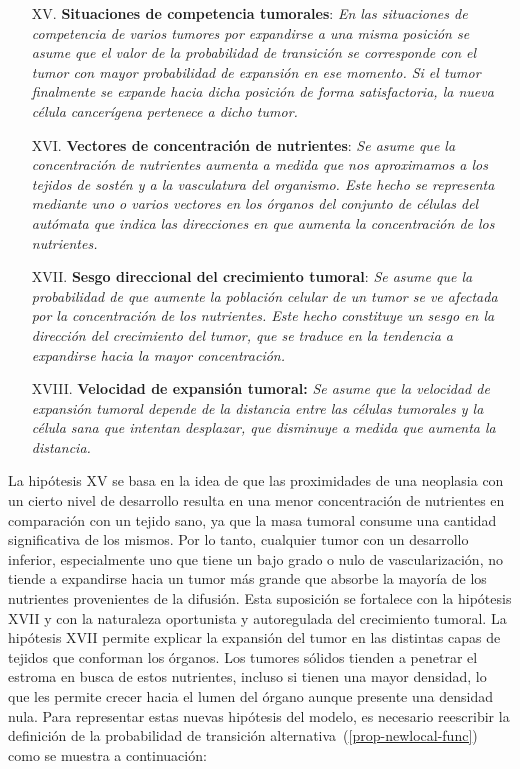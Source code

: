 \begin{itemize}
\item [{XV.}] \textbf{Situaciones de competencia tumorales}: \emph{En las situaciones de competencia de varios tumores por expandirse a una misma posici\'on se asume que el valor de la probabilidad de transici\'on se corresponde con el tumor con mayor probabilidad de expansi\'on en ese momento. Si el tumor finalmente se expande hacia dicha posici\'on de forma satisfactoria, la nueva c\'elula cancer\'igena pertenece a dicho tumor.} \label{XV}

\item [{XVI.}] \textbf{Vectores de concentraci\'on de nutrientes}: \emph{Se asume que la concentraci\'on de nutrientes aumenta a medida que nos aproximamos a los tejidos de sost\'en y a la vasculatura del organismo. Este hecho se representa mediante uno o varios vectores en los \'organos del conjunto de c\'elulas del aut\'omata que indica las direcciones en que aumenta la concentraci\'on de los nutrientes.} \label{XVI}

\item [{XVII.}] \textbf{Sesgo direccional del crecimiento tumoral}: \emph{Se asume que la probabilidad de que aumente la poblaci\'on celular de un tumor se ve afectada por la concentraci\'on de los nutrientes. Este hecho constituye un sesgo en la direcci\'on del crecimiento del tumor, que se traduce en la tendencia a expandirse hacia la mayor concentraci\'on.} \label{XVII}

\item [XVIII.] \textbf{Velocidad de expansi\'on tumoral:} \emph{Se asume que la velocidad de expansi\'on tumoral depende de la distancia entre las c\'elulas tumorales y la c\'elula sana que intentan desplazar, que disminuye a medida que aumenta la distancia.} \label{XVIII}
\end{itemize}

La hipótesis XV se basa en la idea de que las proximidades de una neoplasia con un cierto nivel de desarrollo resulta en una menor concentración de nutrientes en comparación con un tejido sano, ya que la masa tumoral consume una cantidad significativa de los mismos. Por lo tanto, cualquier tumor con un desarrollo inferior, especialmente uno que tiene un bajo grado o nulo de vascularización, no tiende a expandirse hacia un tumor más grande que absorbe la mayoría de los nutrientes provenientes de la difusión. Esta suposición se fortalece con la hipótesis XVII y con la naturaleza oportunista y autoregulada del crecimiento tumoral. La hipótesis XVII permite explicar la expansión del tumor en las distintas capas de tejidos que conforman los órganos. Los tumores sólidos tienden a penetrar el estroma en busca de estos nutrientes, incluso si tienen una mayor densidad, lo que les permite crecer hacia el lumen del órgano aunque presente una densidad nula. Para representar estas nuevas hipótesis del modelo, es necesario reescribir la definición de la probabilidad de transición alternativa~(\ref{prop-newlocal-func}) como se muestra a continuación:

